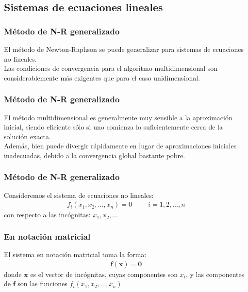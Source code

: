 \subsection{Sistemas de ecuaciones lineales}
\begin{frame}
\frametitle{Método de N-R generalizado}
El método de Newton-Raphson se puede generalizar para sistemas de ecuaciones no lineales.
\\
\bigskip
Las condiciones de convergencia para el algoritmo multidimensional son considerablemente más exigentes que para el caso unidimensional.
\end{frame}
\begin{frame}
\frametitle{Método de N-R generalizado}
El método multidimensional es generalmente muy sensible a la aproximación inicial, siendo eficiente sólo si uno comienza lo suficientemente cerca de la solución exacta.
\\
\bigskip
Además, bien puede divergir rápidamente en lugar de aproximaciones iniciales inadecuadas, debido a la convergencia global bastante pobre.
\end{frame}
\begin{frame}
\frametitle{Método de N-R generalizado}
Consideremos el sistema de ecuaciones no lineales:
\begin{align}
f_{i} (x_{1}, x_{2}, \ldots, x_{n}) = 0 \hspace{1cm} i = 1, 2, \ldots, n
\label{eq:ecuacion_6_43}
\end{align}
con respecto a las incógnitas: $x_{1}, x_{2}, \ldots$
\end{frame}
\begin{frame}
\frametitle{En notación matricial}
El sistema en notación matricial toma la forma:
\begin{align}
\mathbf{f(x)} = \mathbf{0}
\label{eq:ecuacion_6_44}
\end{align}
donde $\mathbf{x}$ es el vector de incógnitas, cuyas componentes son $x_{i}$, y las componentes de $\mathbf{f}$ son las funciones $f_{i}(x_{1}, x_{2}, \ldots, x_{n})$.
\end{frame}
